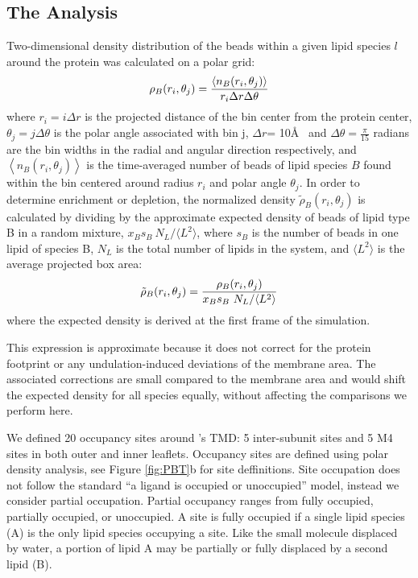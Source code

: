 \subsection{The Analysis}

Two-dimensional density distribution of the beads within a given lipid species $l$ around the protein was calculated on a polar grid:
  \begin{equation}
      \rho_{B}(r_i,\theta_j)= \frac{\left\langle n_{B}(r_i,\theta_j) \right\rangle}{r_i \Delta{r}\Delta{\theta}} \\        
    \label{eq:R}
  \end{equation}
  where  $r_i = i \Delta{r}$ is the projected distance of the bin center from the protein center, $\theta_j = j \Delta{\theta}$ is the polar angle associated with bin j,  $\Delta{r}$= 10\AA~ and  $\Delta{\theta} = \frac{\pi}{15}$ radians are the bin widths in the radial and angular direction respectively, and $\left\langle n_{B}(r_i,\theta_j) \right\rangle$ is the time-averaged number of beads of lipid species $B$ found within the bin centered around radius $r_{i}$ and polar angle $\theta_{j}$.  In order to determine enrichment or depletion, the normalized density $ \tilde{\rho}_{B}(r_i,\theta_j)$ is calculated by dividing by the approximate expected density of beads of lipid type B in a random mixture, $x_{B}s_{B}~N_{L}/\langle L^{2}\rangle$, where $s_{B}$ is the number of beads in one lipid of species B, $N_{L}$ is the total number of lipids in the system, and $\langle L^{2}\rangle$ is the average projected box area:
  \begin{equation}
  \tilde{\rho}_{B}(r_i,\theta_j)=\frac{ \rho_{B}(r_i,\theta_j)}{x_{B}s_{B}~N_{L}/\langle L^{2}\rangle} \\        
    \label{eq:Rt}
  \end{equation}
where the expected density is derived at the first frame of the simulation.
 
 
This expression is approximate because it does not correct for the protein footprint or any undulation-induced deviations of the membrane area.  The associated corrections are small compared to the membrane area and would shift the expected density for all species equally, without affecting the comparisons we perform here. 

We defined 20 occupancy sites around \nachr's TMD: 5 inter-subunit sites and 5 M4 sites in both outer and inner leaflets. Occupancy sites are defined using polar density analysis, see Figure \ref{fig:PBT}b for site deffinitions. Site occupation does not follow the standard ``a ligand is occupied or unoccupied'' model, instead we consider partial occupation. Partial occupancy ranges from fully occupied, partially occupied, or unoccupied. A site is fully occupied if a single lipid species (A) is the only lipid species occupying a site. Like the small molecule displaced by water, a portion of lipid A may be partially or fully displaced by a second lipid (B).  

